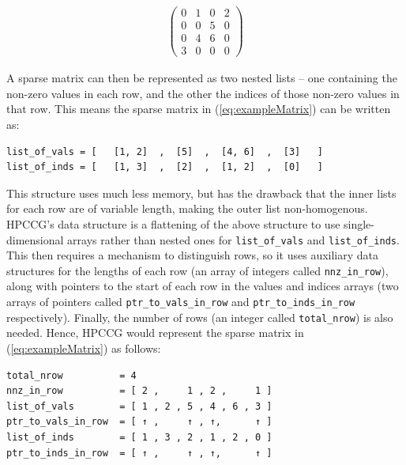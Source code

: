 \begin{align}
    \begin{pmatrix}
        0 & 1 & 0 & 2 \\
        0 & 0 & 5 & 0 \\
        0 & 4 & 6 & 0 \\
        3 & 0 & 0 & 0
    \end{pmatrix}
    \label{eq:exampleMatrix}
\end{align}

A sparse matrix can then be represented as two nested lists -- one containing the non-zero values in each row, and the other the indices of those non-zero values in that row. This means the sparse matrix in (\ref{eq:exampleMatrix}) can be written as:

\begin{verbatim}
list_of_vals = [   [1, 2]  ,  [5]  ,  [4, 6]  ,  [3]   ]
list_of_inds = [   [1, 3]  ,  [2]  ,  [1, 2]  ,  [0]   ]
\end{verbatim}

This structure uses much less memory, but has the drawback that the inner lists for each row are of variable length, making the outer list non-homogenous. HPCCG's data structure is a flattening of the above structure to use single-dimensional arrays rather than nested ones for \texttt{list\_of\_vals} and \texttt{list\_of\_inds}. This then requires a mechanism to distinguish rows, so it uses auxiliary data structures for the lengths of each row (an array of integers called \texttt{nnz\_in\_row}), along with pointers to the start of each row in the values and indices arrays (two arrays of pointers called \texttt{ptr\_to\_vals\_in\_row} and \texttt{ptr\_to\_inds\_in\_row} respectively). Finally, the number of rows (an integer called \texttt{total\_nrow}) is also needed. Hence, HPCCG would represent the sparse matrix in (\ref{eq:exampleMatrix}) as follows:

\begin{verbatim}
total_nrow          = 4
nnz_in_row          = [ 2 ,     1 , 2 ,     1 ]
list_of_vals        = [ 1 , 2 , 5 , 4 , 6 , 3 ]
ptr_to_vals_in_row  = [ ↑ ,     ↑ , ↑,      ↑ ]
list_of_inds        = [ 1 , 3 , 2 , 1 , 2 , 0 ]
ptr_to_inds_in_row  = [ ↑ ,     ↑ , ↑,      ↑ ]
\end{verbatim}

